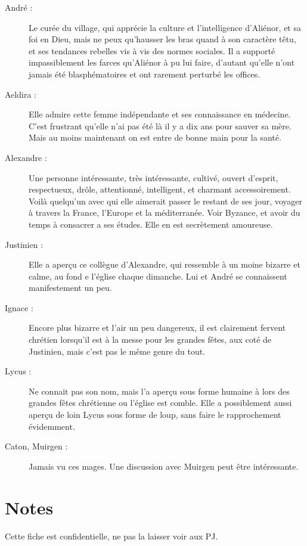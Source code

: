 \begin{description}
\item[André :] Le curée du village, qui apprécie la culture et l'intelligence d'Aliénor, et sa foi en Dieu, mais ne peux qu'hausser les bras quand à son caractère têtu, et ses tendances rebelles vis à vis des normes sociales. Il a supporté impassiblement les farces qu'Aliénor à pu lui faire, d'autant qu'elle n'ont jamais été blasphématoires et ont rarement perturbé les offices.

\item[Aeldira :] Elle admire cette femme indépendante et ses connaissance en médecine. C'est frustrant qu'elle n'ai pas été là il y a dix ans pour sauver sa mère. Mais au moins maintenant on est entre de bonne main pour la santé.

\item[Alexandre :] Une personne intéressante, très intéressante, cultivé, ouvert d'esprit, respectueux, drôle, attentionné, intelligent, et charmant accessoirement. Voilà quelqu'un avec qui elle aimerait passer le restant de ses jour, voyager à travers la France, l'Europe et la méditerranée. Voir Byzance, et avoir du temps à consacrer a ses études. Elle en est secrètement amoureuse.

\item[Justinien :] Elle a aperçu ce collègue d'Alexandre, qui ressemble à un moine bizarre et calme, au fond e l'église chaque dimanche. Lui et André se connaissent manifestement un peu.

\item[Ignace :] Encore plus bizarre et l'air un peu dangereux, il est clairement fervent chrétien lorsqu'il est à la messe pour les grandes fêtes, aux coté de Justinien, mais c'est pas le même genre du tout.

\item[Lycus :] Ne connait pas son nom, mais l'a aperçu sous forme humaine à lors des grandes fêtes chrétienne ou l'église est comble. Elle a possiblement aussi aperçu de loin Lycus sous forme de loup, sans faire le rapprochement évidemment.

\item[Caton, Muirgen :] Jamais vu ces mages. Une discussion avec Muirgen peut être intéressante.

\end{description}

\section*{Notes}
Cette fiche est confidentielle, ne pas la laisser voir aux PJ.

